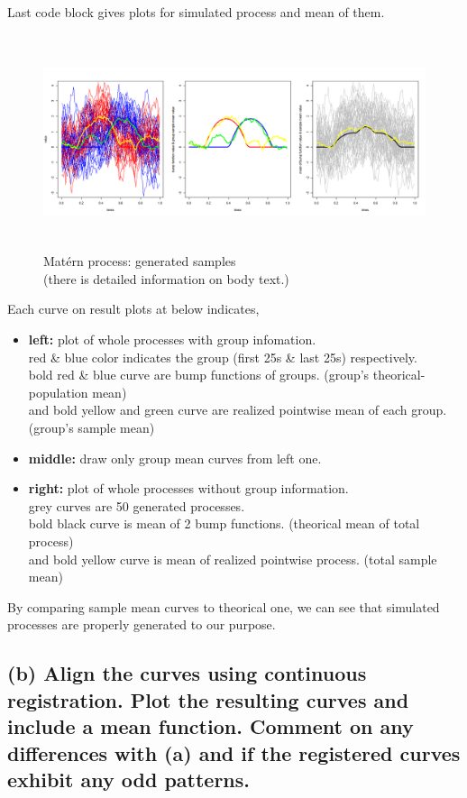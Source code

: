 \documentclass{article}
\begin{document}
Last code block gives plots for simulated process and mean of them.

\begin{figure}[hh]
    \centering
    \includegraphics[height=6.3cm]{matern_verify_sim.png}
    \caption{Mat\'{e}rn process: generated samples\\(there is detailed information on body text.)}
\end{figure}

Each curve on result plots at below indicates,
\begin{itemize}
    \item{\textbf{left:} plot of whole processes with group infomation.\\
    red \& blue color indicates the group (first 25s \& last 25s) respectively.\\
    bold red \& blue curve are bump functions of groups. (group's theorical-population mean)\\
    and bold yellow and green curve are realized pointwise mean of each group. (group's sample mean)}
    \item{\textbf{middle:} draw only group mean curves from left one.}
    \item{\textbf{right:} plot of whole processes without group information.\\
    grey curves are 50 generated processes.\\
    bold black curve is mean of 2 bump functions. (theorical mean of total process)\\
    and bold yellow curve is mean of realized pointwise process. (total sample mean)}
\end{itemize}

By comparing sample mean curves to theorical one, we can see that simulated processes are properly generated to our purpose.


\newpage
\subsection*{(b) Align the curves using continuous registration. Plot the resulting curves and include a mean function. 
Comment on any differences with (a) and if the registered curves exhibit any odd patterns.}
\end{document}
